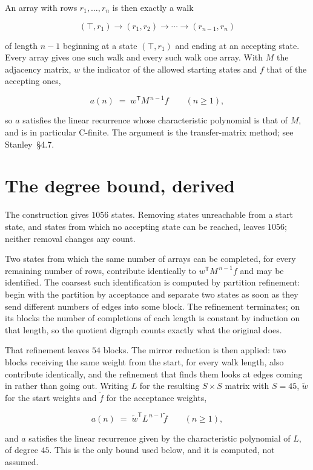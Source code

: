 \documentclass[11pt]{article}
\theoremstyle{definition}
\begin{document}
An array with rows $r_1,\dots,r_n$ is then exactly a walk

\[(\top,r_1) \to (r_1,r_2) \to \cdots \to (r_{n-1},r_n)\]

of length $n-1$ beginning at a state $(\top,r_1)$ and ending at an accepting state. Every array gives one such walk and every such walk one array. With $M$ the adjacency matrix, $w$ the indicator of the allowed starting states and $f$ that of the accepting ones,

\[a(n) \;=\; w^{\mathsf T} M^{\,n-1} f \qquad (n \ge 1),\]

so $a$ satisfies the linear recurrence whose characteristic polynomial is that of $M$, and is in particular C-finite. The argument is the transfer-matrix method; see Stanley~\S4.7.

\section{The degree bound, derived}

The construction gives $1056$ states. Removing states unreachable from a start state, and states from which no accepting state can be reached, leaves $1056$; neither removal changes any count.

Two states from which the same number of arrays can be completed, for every remaining number of rows, contribute identically to $w^{\mathsf T}M^{\,n-1}f$ and may be identified. The coarsest such identification is computed by partition refinement: begin with the partition by acceptance and separate two states as soon as they send different numbers of edges into some block. The refinement terminates; on its blocks the number of completions of each length is constant by induction on that length, so the quotient digraph counts exactly what the original does.

That refinement leaves $54$ blocks. The mirror reduction is then applied: two blocks receiving the same weight from the start, for every walk length, also contribute identically, and the refinement that finds them looks at edges coming in rather than going out. Writing $L$ for the resulting $S \times S$ matrix with $S = 45$, $\tilde w$ for the start weights and $\tilde f$ for the acceptance weights,

\[a(n) \;=\; \tilde w^{\mathsf T} L^{\,n-1} \tilde f \qquad (n \ge 1),\]

and $a$ satisfies the linear recurrence given by the characteristic polynomial of $L$, of degree $45$. This is the only bound used below, and it is computed, not assumed.
\end{document}
